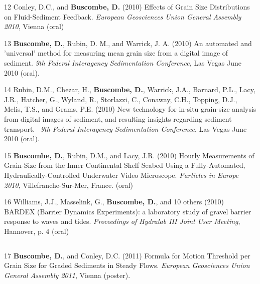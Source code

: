 \documentclass[margin,line]{resume}
\begin{document}
\begin{resume}
\begin{footnotesize}
\begin{list1}
	\item[12] Conley, D.C., and {\bf Buscombe, D.} (2010) Effects of Grain Size Distributions on Fluid-Sediment Feedback. {\sl European Geosciences Union General Assembly 2010}, Vienna (oral)\\

	\item[13] {\bf Buscombe, D.}, Rubin, D. M., and Warrick, J. A. (2010) An automated and 'universal' method for measuring mean grain size from a digital image of sediment. {\sl 9th Federal Interagency Sedimentation Conference}, Las Vegas June 2010 (oral).\\

	\item[14] Rubin, D.M., Chezar, H., {\bf Buscombe, D.}, Warrick, J.A., Barnard, P.L., Lacy, J.R., Hatcher, G., Wyland, R., Storlazzi, C., Conaway, C.H., Topping, D.J., Melis, T.S., and Grams, P.E. (2010) New technology for in-situ grain-size analysis from digital images of sediment, and resulting insights regarding sediment transport.  {\sl 9th Federal Interagency Sedimentation Conference}, Las Vegas June 2010 (oral).\\

	\item[15] {\bf Buscombe, D.}, Rubin, D.M., and Lacy, J.R. (2010) Hourly Measurements of Grain-Size from the Inner Continental Shelf Seabed Using a Fully-Automated, Hydraulically-Controlled Underwater Video Microscope. {\sl Particles in Europe 2010}, Villefranche-Sur-Mer, France. (oral)\\

	\item[16] Williams, J.J., Masselink, G., {\bf Buscombe, D.}, and 10 others (2010) BARDEX (Barrier Dynamics Experiments): a laboratory study of gravel barrier response to waves and tides. {\sl Proceedings of Hydralab III Joint User Meeting}, Hannover, p. 4 (oral)
	\end{list1}

	\subsection{}
	\begin{list1}
	\item[17] {\bf Buscombe, D.}, and Conley, D.C. (2011) Formula for Motion Threshold per Grain Size for Graded Sediments in Steady Flows. {\sl European Geosciences Union General Assembly 2011}, Vienna (poster).\\


\end{list1}
\end{footnotesize}
\end{resume}
\end{document}
